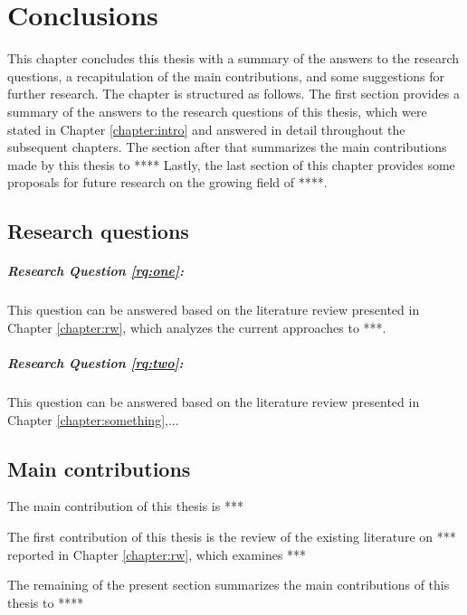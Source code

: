 \chapter{Conclusions}
\label{chapter:conclusions}


This chapter concludes this thesis with a summary of the answers to the research questions, a recapitulation of the main contributions, and some suggestions for further research. The chapter is structured as follows. The first section provides a summary of the answers to the research questions of this thesis, which were stated in Chapter \ref{chapter:intro} and answered in detail throughout the subsequent chapters. The section after that summarizes the main contributions made by this thesis to **** Lastly, the last section of this chapter provides some proposals for future research on the growing field of ****.
\newpage

\section{Research questions}

\paragraph*{Research Question \ref{rq:one}: }\mbox{}

 
\noindent  This question can be answered based on the literature review presented in Chapter \ref{chapter:rw}, which analyzes the current approaches to ***.


\newpage
\paragraph*{Research Question \ref{rq:two}: }\mbox{}

\noindent  This question can be answered based on the literature review presented in Chapter \ref{chapter:something},...


\newpage
\section{Main contributions}

The main contribution of this thesis is ***


The first contribution of this thesis is the review of the existing literature on  *** reported in Chapter \ref{chapter:rw}, which examines ***

The remaining of the present section summarizes the main contributions of this thesis to ****

